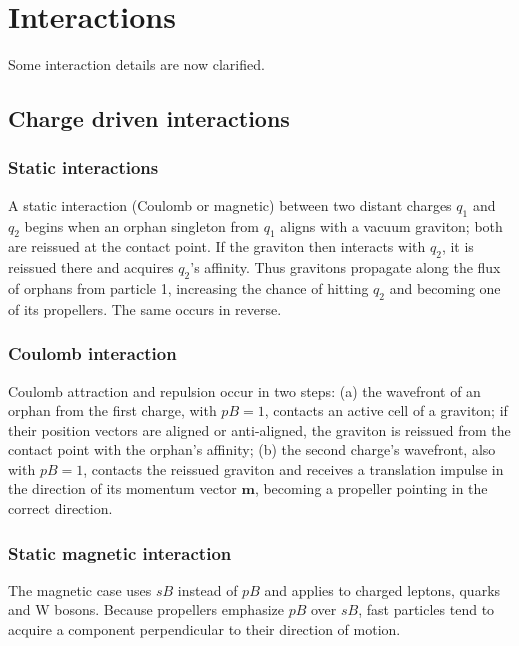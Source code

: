 \documentclass{ijuc}
\begin{document}

\section{Interactions\label{sec:Interactions}}

Some interaction details are now clarified.

\subsection{Charge driven interactions}


\subsubsection{Static interactions}

A static interaction (Coulomb or magnetic) between two distant charges $q_1$ and $q_2$ begins when an orphan singleton from $q_1$ aligns with a vacuum graviton; both are reissued at the contact point. If the graviton then interacts with $q_2$, it is reissued there and acquires $q_2$'s affinity. Thus gravitons propagate along the flux of orphans from particle 1, increasing the chance of hitting $q_2$ and becoming one of its propellers. The same occurs in reverse.

\subsubsection{Coulomb interaction} \label{subsec:Coulomb-interaction}

Coulomb attraction and repulsion occur in two steps: (a) the wavefront of an orphan from the first charge, with $pB=1$, contacts an active cell of a graviton; if their position vectors are aligned or anti-aligned, the graviton is reissued from the contact point with the orphan's affinity; (b) the second charge's wavefront, also with $pB=1$, contacts the reissued graviton and receives a translation impulse in the direction of its momentum vector $\boldsymbol{m}$, becoming a propeller pointing in the correct direction.

\subsubsection{Static magnetic interaction}

The magnetic case uses $sB$ instead of $pB$ and applies to charged leptons, quarks and W bosons. Because propellers emphasize $pB$ over $sB$, fast particles tend to acquire a component perpendicular to their direction of motion.
\end{document}
